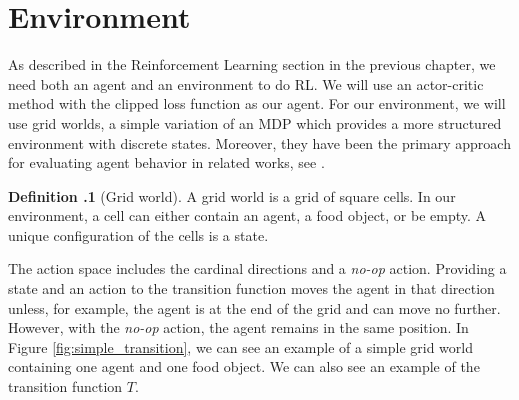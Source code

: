 \documentclass[12pt,A4]{report}
\theoremstyle{definition}
\begin{document}
\section{Environment}
As described in the Reinforcement Learning section in the previous chapter, we need both an agent and an environment to do RL. We will use an actor-critic method with the clipped loss function as our agent. For our environment, we will use grid worlds, a simple variation of an MDP which provides a more structured environment with discrete states. Moreover, they have been the primary approach for evaluating agent behavior in related works, see \citet{Turner20, Krakovna19, Krakovna20}.


\begin{displayquote}
  \textbf{Definition \thesection.1} (Grid world).
  A grid world is a grid of square cells. In our environment, a cell can either contain an agent, a food object, or be empty. A unique configuration of the cells is a state. 
\end{displayquote}

The action space includes the cardinal directions and a \textit{no-op} action. Providing a state and an action to the transition function moves the agent in that direction unless, for example, the agent is at the end of the grid and can move no further. However, with the \textit{no-op} action, the agent remains in the same position. In Figure \ref{fig:simple_transition}, we can see an example of a simple grid world containing one agent and one food object. We can also see an example of the transition function $T$. 
\end{document}
